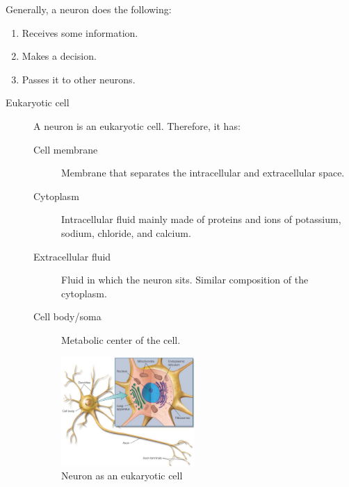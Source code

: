 Generally, a neuron does the following:
\begin{enumerate}
    \item Receives some information.
    \item Makes a decision.
    \item Passes it to other neurons.
\end{enumerate}

\begin{description}
    \item[Eukaryotic cell] 
        A neuron is an eukaryotic cell. Therefore, it has:
        \begin{description}
            \item[Cell membrane] Membrane that separates the intracellular and extracellular space.
            \item[Cytoplasm] Intracellular fluid mainly made of proteins and ions of potassium, sodium, chloride, and calcium.
            \item[Extracellular fluid] Fluid in which the neuron sits. Similar composition of the cytoplasm.
            \item[Cell body/soma] Metabolic center of the cell.
        \end{description}

        \begin{figure}[H]
            \centering
            \includegraphics[width=0.5\textwidth]{img/neuron_eukaryotic.png}
            \caption{Neuron as an eukaryotic cell}
        \end{figure}
\end{description}

